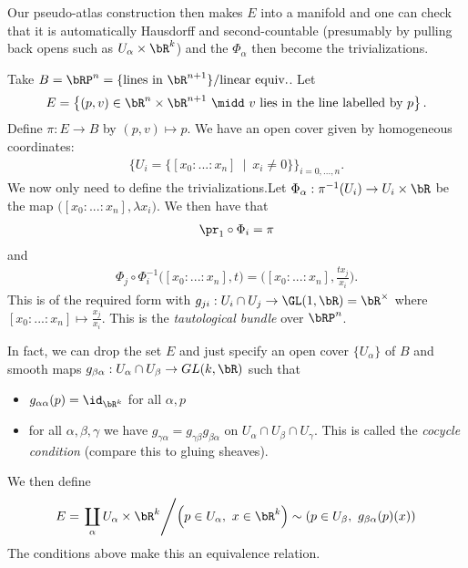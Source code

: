 Our pseudo-atlas construction then makes $E$ into a manifold and one can check that it is automatically Hausdorff and second-countable (presumably by pulling back opens such as $U_\alpha \times \bR^k$) and the $\Phi_\alpha$ then become the trivializations.

\begin{example}\label{example:lec2.17}
	Take $B = \bRP^n = \{\text{lines in $\bR^{n+1}$}\}/\text{linear equiv.}$. Let
	\begin{align*}
		E = \left\{(p,v) \in \bR^n \times \bR^{n+1}~\midd~ \text{$v$ lies in the line labelled by $p$}\right\} .
	\end{align*}
	Define $\pi:E\to B$ by $(p,v) \mapsto p$. We have an open cover given by homogeneous coordinates: 
	\begin{align*}
		\big\{U_i = \{[x_0:...:x_n] ~\mid~ x_i \neq 0\}\big\}_{i=0,...,n}.
	\end{align*}
	We now only need to define the trivializations.Let $\Phi_\alpha:\pi^{-1}(U_i) \to U_i \times \bR$ be the map $\big([x_0:...:x_n], \lambda x_i\big)$. We then have that 
	\begin{align*}
		\pr_1 \circ \Phi_i = \pi
	\end{align*}
	and
	\begin{align*}
		\Phi_j\circ \Phi_i^{-1}\big([x_0:...:x_n],t\big) = \big([x_0:...:x_n], \frac{tx_j}{x_i}\big).
	\end{align*}
    This is of the required form with $g_{ji}:U_i \cap U_j \to \GL(1,\bR) = \bR^\times$ where $[x_0:...:x_n]\mapsto \frac{x_j}{x_i}$. This is the \emph{tautological bundle} over $\bRP^n$.

    In fact, we can drop the set $E$ and just specify an open cover $\{U_\alpha\}$ of $B$ and smooth maps $g_{\beta\alpha}:U_\alpha \cap U_\beta \to GL(k,\bR)$ such that
    \begin{itemize}
	    \item $g_{\alpha\alpha}(p) = \id_{\bR^k}$ for all $\alpha, p$
	    \item for all $\alpha, \beta, \gamma$ we have $g_{\gamma\alpha} = g_{\gamma\beta}g_{\beta\alpha}$ on $U_\alpha \cap U_\beta \cap U_\gamma$. This is called the \emph{cocycle condition} (compare this to gluing sheaves).
    \end{itemize}
    We then define
	\begin{align*}
		E = \left.\coprod_\alpha U_\alpha \times \bR^k \middle/ \left(p \in U_\alpha, ~ x \in \bR^k\right)\sim \left(p \in U_\beta, ~ g_{\beta\alpha}(p)(x)\right)\right.
	\end{align*}
	The conditions above make this an equivalence relation.
\end{example}

